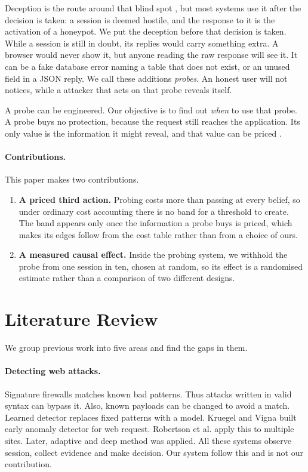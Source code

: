 \documentclass[runningheads]{llncs}
\begin{document}
Deception is the route around that blind spot \cite{pawlick2019taxonomy,provos2004honeyd}, but most systems use it after the decision is taken: a session is deemed hostile, and the response to it is the activation of a honeypot. We put the deception before that decision is taken. While a session is still in doubt, its replies would carry something extra. A browser would never show it, but anyone reading the raw response will see it. It can be a fake database error naming a table that does not exist, or an unused field in a JSON reply. We call these additions \emph{probes}. An honest user will not notices, while a attacker that acts on that probe reveals itself.

A probe can be engineered. Our objective is to find out \emph{when} to use that probe. A probe buys no protection, because the request still reaches the application. Its only value is the information it might reveal, and that value can be priced \cite{howard1966information}.

\paragraph{Contributions.} This paper makes two contributions.
\begin{enumerate}
\item \textbf{A priced third action.} Probing costs more than passing at every belief, so under ordinary cost accounting there is no band for a threshold to create. The band appears only once the information a probe buys is priced, which makes its edges follow from the cost table rather than from a choice of ours.

\item \textbf{A measured causal effect.} Inside the probing system, we withhold the probe from one session in ten, chosen at random, so its effect is a randomised estimate rather than a comparison of two different designs.
\end{enumerate}

\section{Literature Review}
We group previous work into five areas and find the gaps in them.

\paragraph{Detecting web attacks.} Signature firewalls matches known bad patterns. Thus attacks written in valid syntax can bypass it. Also, known payloads can be changed to avoid a match. Learned detector replaces fixed patterns with a model. Kruegel and Vigna \cite{kruegel2003anomaly} built early anomaly detector for web request. Robertson et al. \cite{robertson2006generalization} apply this to multiple sites. Later, adaptive \cite{amouei2022rat} and deep \cite{tekerek2021novel} method was applied. All these systems observe session, collect evidence and make decision. Our system follow this and is not our contribution. 
\end{document}

